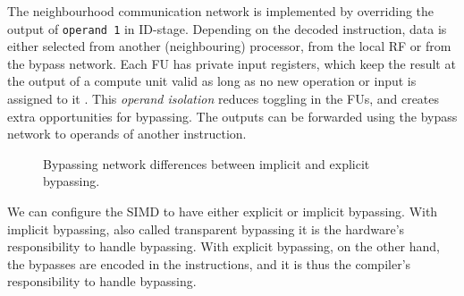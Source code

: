 The neighbourhood communication network is implemented by overriding the output of \texttt{operand 1} in ID-stage. Depending on the decoded instruction, data is either selected from another (neighbouring) processor, from the local RF or from the bypass network. Each FU has private input registers, which keep the result at the output of a compute unit valid as long as no new operation or input is assigned to it \cite{dongrio1}. This \emph{operand isolation} reduces toggling in the FUs, and creates extra opportunities for bypassing. The outputs can be forwarded using the bypass network to operands of another instruction.

\begin{figure}[b!]
\centering
{}
\hfil
{}
\caption{Bypassing network differences between implicit and explicit bypassing.}
\label{fig:datapath_approaches}
\end{figure}

We can configure the SIMD to have either explicit or implicit bypassing. With implicit bypassing, also called transparent bypassing it is the hardware's responsibility to handle bypassing. With explicit bypassing, on the other hand, the bypasses are encoded in the instructions, and it is thus the compiler's responsibility to handle bypassing.

